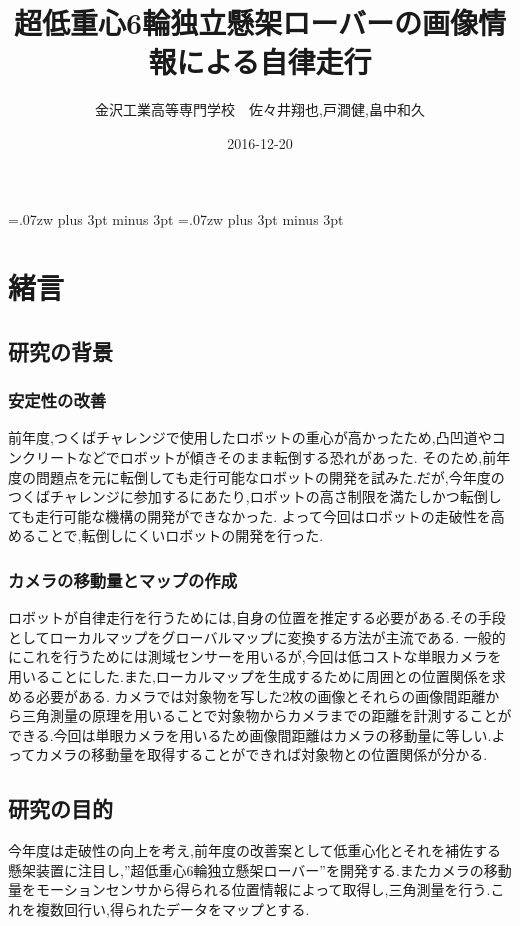 \documentclass[twocolumn,11pt]{sotsuken_abst}
\title{超低重心6輪独立懸架ローバーの画像情報による自律走行}
\author{金沢工業高等専門学校　佐々井翔也,戸澗健,畠中和久}
\date{2016-12-20}
\begin{document}
\maketitle
\thispagestyle{fancy}
\pagestyle{fancy}

\setlength{\baselineskip}{5.6truemm}
\kanjiskip=.07zw plus 3pt minus 3pt
\xkanjiskip=.07zw plus 3pt minus 3pt

\section{緒言}
\subsection{研究の背景}

\subsubsection{安定性の改善}
前年度,つくばチャレンジで使用したロボットの重心が高かったため,凸凹道やコンクリートなどでロボットが傾きそのまま転倒する恐れがあった.
そのため,前年度の問題点を元に転倒しても走行可能なロボットの開発を試みた.だが,今年度のつくばチャレンジに参加するにあたり,ロボットの高さ制限を満たしかつ転倒しても走行可能な機構の開発ができなかった.
よって今回はロボットの走破性を高めることで,転倒しにくいロボットの開発を行った.
\subsubsection{カメラの移動量とマップの作成}
ロボットが自律走行を行うためには,自身の位置を推定する必要がある.その手段としてローカルマップをグローバルマップに変換する方法が主流である.
一般的にこれを行うためには測域センサーを用いるが,今回は低コストな単眼カメラを用いることにした.また,ローカルマップを生成するために周囲との位置関係を求める必要がある.
カメラでは対象物を写した2枚の画像とそれらの画像間距離から三角測量の原理を用いることで対象物からカメラまでの距離を計測することができる.今回は単眼カメラを用いるため画像間距離はカメラの移動量に等しい.よってカメラの移動量を取得することができれば対象物との位置関係が分かる.

\subsection{研究の目的}
今年度は走破性の向上を考え,前年度の改善案として低重心化とそれを補佐する懸架装置に注目し,”超低重心6輪独立懸架ローバー”を開発する.またカメラの移動量をモーションセンサから得られる位置情報によって取得し,三角測量を行う.これを複数回行い,得られたデータをマップとする.
\end{document}
